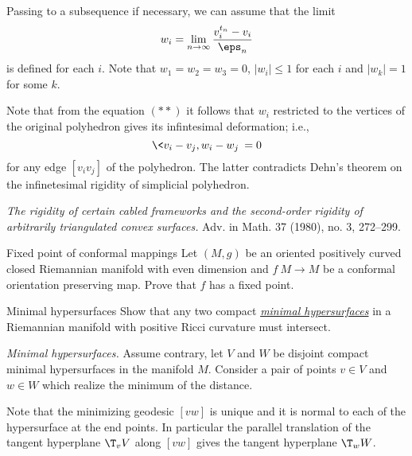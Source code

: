 Passing to a subsequence if necessary,
we can assume that the limit
\[w_i=\lim_{n\to\infty} \frac{v_i^{t_n}-v_i}{\eps_n}\] 
is defined for each $i$.
Note that $w_1=w_2=w_3=0$,
$|w_i|\le 1$ for each $i$ 
and $|w_k|=1$ for some $k$.

Note that from the equation $({*}{*})$ it follows that $w_i$ restricted to the vertices of the original polyhedron gives its  infintesimal deformation;
i.e., 
\[\<v_i-v_j,w_i-w_j\>=0\]
for any edge $[v_iv_j]$ of the polyhedron.
The latter contradicts Dehn's theorem on the infinetesimal rigidity of simplicial polyhedron. 

\textit{The rigidity of certain cabled frameworks and the second-order rigidity of arbitrarily triangulated convex surfaces.} Adv. in Math. 37 (1980), no. 3, 272--299.











\begin{pr}{}{Fixed point of conformal mappings}\label{Fixed point of conformal mappings}
Let $(M,g)$ be an oriented positively curved closed Riemannian manifold with even dimension
and $f\:M\to M$ be a conformal orientation preserving map. 
Prove that $f$ has a fixed point.
\sign{\cite[\ref{weinstein-Fixed-pnt}]{weinstein}}
\end{pr}








\begin{pr}{}{Minimal hypersurfaces}\label{Minimal hypersurfaces}
Show that any two compact \hyperref[Minimal surface]{\emph{minimal hypersurfaces}} in a Riemannian manifold with positive Ricci curvature must intersect.
\end{pr}

\textit{Minimal hypersurfaces.}
Assume contrary, let $V$ and $W$ be disjoint compact minimal hypersurfaces in the manifold $M$.
Consider a pair of points $v\in V$ and $w\in W$ which realize the minimum of the distance.

Note that the minimizing geodesic $[vw]$ is unique and it is normal to each of the hypersurface at the end points.
In particular the parallel translation of the tangent hyperplane $\T_vV$ along $[vw]$ gives the tangent hyperplane $\T_wW$.

